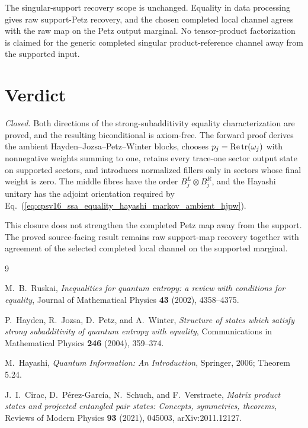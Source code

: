 \documentclass[11pt]{article}
\begin{document}
The singular-support recovery scope is unchanged. Equality in data processing
gives raw support-Petz recovery, and the chosen completed local channel agrees
with the raw map on the Petz output marginal. No tensor-product factorization
is claimed for the generic completed singular product-reference channel away
from the supported input.

\section{Verdict}

\emph{Closed.} Both directions of the strong-subadditivity equality
characterization are proved, and the resulting biconditional is axiom-free.
The forward proof derives the ambient Hayden--Jozsa--Petz--Winter blocks,
chooses $p_j=\operatorname{Re}\operatorname{tr}(\omega_j)$ with nonnegative weights summing
to one, retains every trace-one sector output state on supported sectors, and
introduces normalized fillers only in sectors whose final weight is zero. The
middle fibres have the order $B_j^L\otimes B_j^R$, and the Hayashi unitary has
the adjoint orientation required by
Eq.~(\ref{eq:cpsv16_ssa_equality_hayashi_markov_ambient_hjpw}).

This closure does not strengthen the completed Petz map away from the support.
The proved source-facing result remains raw support-map recovery together with
agreement of the selected completed local channel on the supported marginal.

\begin{thebibliography}{9}

  M.~B.~Ruskai,
  \emph{Inequalities for quantum entropy: a review with conditions for
  equality},
  Journal of Mathematical Physics \textbf{43} (2002), 4358--4375.

  P.~Hayden, R.~Jozsa, D.~Petz, and A.~Winter,
  \emph{Structure of states which satisfy strong subadditivity of quantum
  entropy with equality},
  Communications in Mathematical Physics \textbf{246} (2004), 359--374.

  M.~Hayashi,
  \emph{Quantum Information: An Introduction},
  Springer, 2006; Theorem 5.24.

  J.~I.~Cirac, D.~P\'erez-Garc\'ia, N.~Schuch, and F.~Verstraete,
  \emph{Matrix product states and projected entangled pair states: Concepts,
  symmetries, theorems},
  Reviews of Modern Physics \textbf{93} (2021), 045003,
  arXiv:2011.12127.

\end{thebibliography}
\end{document}

